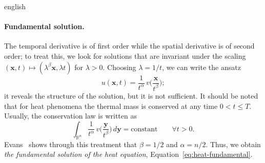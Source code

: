 \documentclass[../0000.tex]{subfiles}
\begin{document}
\begin{hyphenrules}{english}
\paragraph{Fundamental solution.}
The temporal derivative is of first order while the spatial derivative is of second order; to treat
this, we look for solutions that are invariant under the scaling $(\mathbf{x},t)\mapsto(\lambda^{\beta}\mathbf{x},\lambda t)$
for $\lambda>0$. Choosing $\lambda=1/t$, we can write the ansatz
\begin{equation}
  u(\mathbf{x},t)=\frac{1}{t^{\alpha}}\,v\Big(\frac{\mathbf{x}}{t^{\beta}}\Big);
  \label{eq:heat-ansatz}
\end{equation}
it reveals the structure of the solution, but it is not sufficient. It should be noted that for heat
phenomena the thermal mass is conserved at any time $0<t\le T$. Usually, the conservation law is
written as
\begin{equation}
  \int_{\mathbb{R}^n}\frac{1}{t^{\alpha}}\,v\Big(\frac{\mathbf{y}}{t^{\beta}}\Big)\,d\mathbf{y}=\text{constant}\qquad\forall t>0.
  \label{eq:heat-mass}
\end{equation}
Evans~\cite{evans2010} shows through this treatment that $\beta=1/2$ and $\alpha=n/2$. Thus, we obtain
\emph{the fundamental solution of the heat equation}, Equation~\eqref{eq:heat-fundamental}.


\end{hyphenrules}
\end{document}
